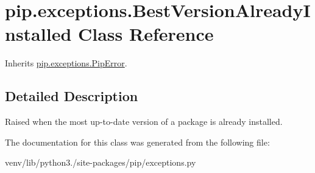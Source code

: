\hypertarget{classpip_1_1exceptions_1_1_best_version_already_installed}{}\section{pip.\+exceptions.\+Best\+Version\+Already\+Installed Class Reference}
\label{classpip_1_1exceptions_1_1_best_version_already_installed}


Inherits \hyperlink{classpip_1_1exceptions_1_1_pip_error}{pip.\+exceptions.\+Pip\+Error}.



\subsection{Detailed Description}
\begin{DoxyVerb}Raised when the most up-to-date version of a package is already
installed.\end{DoxyVerb}
 

The documentation for this class was generated from the following file\+:\begin{DoxyCompactItemize}
\item 
venv/lib/python3./site-\/packages/pip/exceptions.\+py\end{DoxyCompactItemize}

